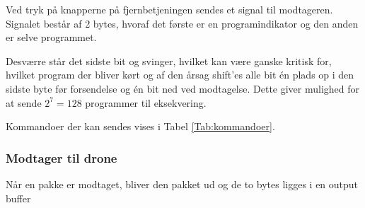 \documentclass[Main]{subfiles}
\begin{document}
Ved tryk på knapperne på fjernbetjeningen sendes et signal til modtageren.
Signalet består af 2 bytes, hvoraf det første er en programindikator og den anden er selve programmet.

Desværre står det sidste bit og svinger, hvilket kan være ganske kritisk for, hvilket program der bliver kørt og af den årsag shift'es alle bit én plads op i den sidste byte før forsendelse og én bit ned ved modtagelse.
Dette giver mulighed for at sende $2^7 = 128$ programmer til eksekvering.

Kommandoer der kan sendes vises i Tabel \ref{Tab:kommandoer}.



\subsubsection{Modtager til drone}
Når en pakke er modtaget, bliver den pakket ud og de to bytes ligges i en output buffer
\end{document}
